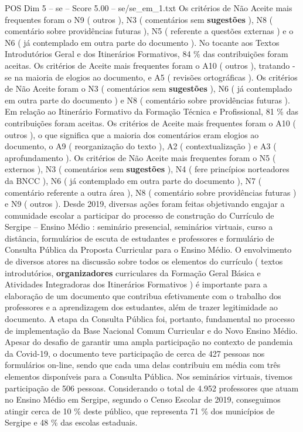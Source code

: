 \begin{textsample}{POS Dim 5 – se – Score 5.00 – se/se\_em\_1.txt}
Os critérios de Não Aceite mais frequentes foram o N9 ( outros ), N3 ( comentários sem \textbf{sugestões} ), N8 ( comentário sobre providências futuras ), N5 ( referente a questões externas ) e o N6 ( já contemplado em outra parte do documento ).
No tocante aos Textos Introdutórios Geral e dos Itinerários Formativos, 84 \% das contribuições foram aceitas.
Os critérios de Aceite mais frequentes foram o A10 ( outros ), tratando -se na maioria de elogios ao documento, e A5 ( revisões ortográficas ).
Os critérios de Não Aceite foram o N3 ( comentários sem \textbf{sugestões} ), N6 ( já contemplado em outra parte do documento ) e N8 ( comentário sobre providências futuras ).
Em relação ao Itinerário Formativo da Formação Técnica e Profissional, 81 \% das contribuições foram aceitas.
Os critérios de Aceite mais frequentes foram o A10 ( outros ), o que significa que a maioria dos comentários eram elogios ao documento, o A9 ( reorganização do texto ), A2 ( contextualização ) e A3 ( aprofundamento ).
Os critérios de Não Aceite mais frequentes foram o N5 ( externos ), N3 ( comentários sem \textbf{sugestões} ), N4 ( fere princípios norteadores da BNCC ), N6 ( já contemplado em outra parte do documento ), N7 ( comentário referente a outra área ), N8 ( comentário sobre providências futuras ) e N9 ( outros ).
Desde 2019, diversas ações foram feitas objetivando engajar a comunidade escolar a participar do processo de construção do Currículo de Sergipe – Ensino Médio : seminário presencial, seminários virtuais, curso a distância, formulários de escuta de estudantes e professores e formulário de Consulta Pública da Proposta Curricular para o Ensino Médio.
O envolvimento de diversos atores na discussão sobre todos os elementos do currículo ( textos introdutórios, \textbf{organizadores} curriculares da Formação Geral Básica e Atividades Integradoras dos Itinerários Formativos ) é importante para a elaboração de um documento que contribua efetivamente com o trabalho dos professores e a aprendizagem dos estudantes, além de trazer legitimidade ao documento.
A etapa da Consulta Pública foi, portanto, fundamental no processo de implementação da Base Nacional Comum Curricular e do Novo Ensino Médio.
Apesar do desafio de garantir uma ampla participação no contexto de pandemia da Covid-19, o documento teve participação de cerca de 427 pessoas nos formulários on-line, sendo que cada uma delas contribuiu em média com três elementos disponíveis para a Consulta Pública.
Nos seminários virtuais, tivemos participação de 506 pessoas.
Considerando o total de 4.952 professores que atuam no Ensino Médio em Sergipe, segundo o Censo Escolar de 2019, conseguimos atingir cerca de 10 \% deste público, que representa 71 \% dos municípios de Sergipe e 48 \% das escolas estaduais.

\end{textsample}
